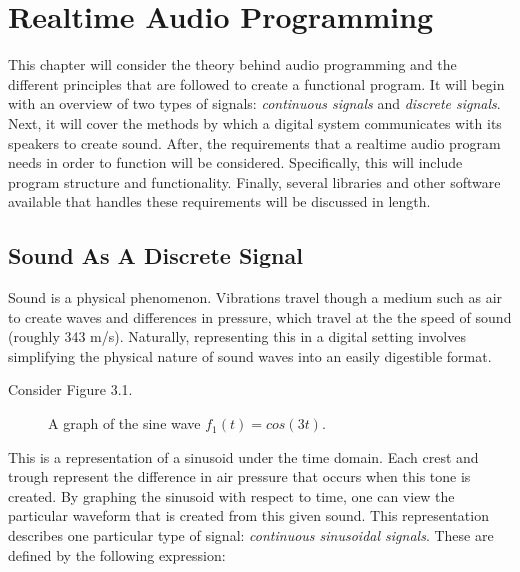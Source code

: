 \chapter{Realtime Audio Programming}
\hspace*{-0.12cm}This chapter will consider the theory behind audio programming and the different principles that are followed to create a functional program. It will begin with an overview of two types of signals: \textit{continuous signals} and \textit{discrete signals}. Next, it will cover the methods by which a digital system communicates with its speakers to create sound. After, the requirements that a realtime audio program needs in order to function will be considered. Specifically, this will include program structure and functionality. Finally, several libraries and other software available that handles these requirements will be discussed in length.
\section{Sound As A Discrete Signal}
Sound is a physical phenomenon. Vibrations travel though a medium such as air to create waves and differences in pressure, which travel at the the speed of sound (roughly 343 m/s). Naturally, representing this in a digital setting involves simplifying the physical nature of sound waves into an easily digestible format.

Consider Figure 3.1.

\begin{figure}[h] %
\begin{center}
	\caption{A graph of the sine wave \(f_1(t) = cos(3t)\).}
\end{center}
\end{figure}

This is a representation of a sinusoid under the time domain. Each crest and trough represent the difference in air pressure that occurs when this tone is created. By graphing the sinusoid with respect to time, one can view the particular waveform that is created from this given sound. This representation describes one particular type of signal: \textit{continuous sinusoidal signals}. These are defined by the following expression:

